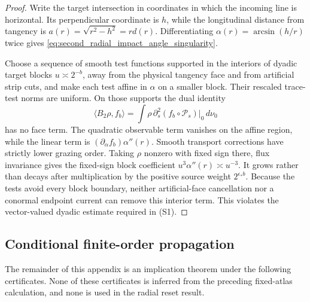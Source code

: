 \documentclass[11pt]{amsart}
\theoremstyle{compactplain}
\theoremstyle{compactdefinition}
\theoremstyle{compactremark}
\newcommand{\Pcal}{\mathcal P}
\begin{document}
\begin{proof}
Write the target intersection in coordinates in which the incoming line is
horizontal.  Its perpendicular coordinate is \(h\), while the longitudinal
distance from tangency is
\(a(r)=\sqrt{r^2-h^2}=rd(r)\).  Differentiating
\(\alpha(r)=\arcsin(h/r)\) twice gives
\eqref{eq:second_radial_impact_angle_singularity}.

Choose a sequence of smooth test functions supported in the interiors of
dyadic target blocks \(u\asymp2^{-b}\), away from the physical tangency face
and from artificial strip cuts, and make each test affine in \(\alpha\) on a
smaller block.  Their rescaled trace-test norms are uniform.  On those
supports the dual identity
\[
 \langle B_2\rho,f_b\rangle
 =\int \rho\,\partial_s^2(f_b\circ\Pcal_s)|_0\,d\nu_0
\]
has no face term.  The quadratic observable term vanishes on the affine
region, while the linear term is
\((\partial_\alpha f_b)\alpha''(r)\).  Smooth transport corrections have
strictly lower grazing order.  Taking \(\rho\) nonzero with fixed sign there,
flux invariance gives the fixed-sign block coefficient
\(u^3\alpha''(r)\asymp u^{-3}\).  It grows rather than decays after
multiplication by the positive source weight \(2^{\epsilon_*b}\).  Because
the tests avoid every block boundary, neither artificial-face cancellation
nor a conormal endpoint current can remove this interior term.  This violates
the vector-valued dyadic estimate required in (S1).
\end{proof}

\subsection{Conditional finite-order propagation}

The remainder of this appendix is an implication theorem under the following
certificates.  None of these certificates is inferred from the preceding
fixed-atlas calculation, and none is used in the radial reset result.
\end{document}
